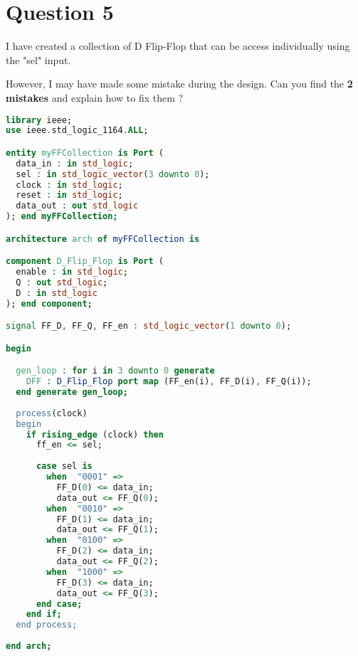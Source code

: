 \section*{Question 5}
I have created a collection of D Flip-Flop that can be access individually using the "sel" input.

However, I may have made some mistake during the design. Can you find the \textbf{2 mistakes} and explain how to fix them ?


\vspace{0.5cm}
\begin{lstlisting}[language=vhdl]
library ieee;
use ieee.std_logic_1164.ALL;

entity myFFCollection is Port (
  data_in : in std_logic;
  sel : in std_logic_vector(3 downto 0);
  clock : in std_logic;
  reset : in std_logic;
  data_out : out std_logic
); end myFFCollection;

architecture arch of myFFCollection is

component D_Flip_Flop is Port (
  enable : in std_logic;
  Q : out std_logic;
  D : in std_logic
); end component;

signal FF_D, FF_Q, FF_en : std_logic_vector(1 downto 0);

begin    

  gen_loop : for i in 3 downto 0 generate
    DFF : D_Flip_Flop port map (FF_en(i), FF_D(i), FF_Q(i));
  end generate gen_loop;
  
  process(clock)
  begin
    if rising_edge (clock) then
      ff_en <= sel;
      
      case sel is
        when  "0001" =>
          FF_D(0) <= data_in;
          data_out <= FF_Q(0);
        when  "0010" =>
          FF_D(1) <= data_in;
          data_out <= FF_Q(1);
        when  "0100" =>
          FF_D(2) <= data_in;
          data_out <= FF_Q(2);
        when  "1000" =>
          FF_D(3) <= data_in;
          data_out <= FF_Q(3);
      end case;
    end if;
  end process;
             
end arch;
\end{lstlisting}
\vspace{0.5cm}

\newpage
\null
\newpage